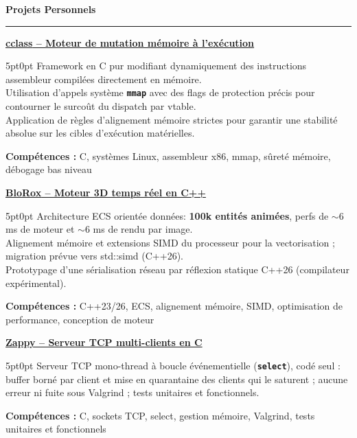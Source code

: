 \documentclass[9pt]{extarticle}
\begin{document}
\par\vspace{5pt}

{\large\bfseries Projets Personnels}
\par\vspace{-8pt}
\rule{\linewidth}{0.4pt}
\par\vspace{5pt}

\underline{\bfseries \href{https://github.com/paulogarithm/cclass}{cclass} -- Moteur de mutation mémoire à l'exécution}
\par
\begin{adjustwidth}{5pt}{0pt}
    Framework en C pur modifiant dynamiquement des instructions assembleur compilées directement en mémoire. \\
    Utilisation d'appels système {\bfseries \texttt{mmap}} avec des flags de protection précis pour contourner le surcoût du dispatch par vtable. \\
    Application de règles d'alignement mémoire strictes pour garantir une stabilité absolue sur les cibles d'exécution matérielles.
\end{adjustwidth}
\par
{\bfseries Compétences :} C, systèmes Linux, assembleur x86, mmap, sûreté mémoire, débogage bas niveau

\par\vspace{8pt}

\underline{\bfseries \href{https://github.com/paulogarithm/blorox}{BloRox} -- Moteur 3D temps réel en C++}
\par
\begin{adjustwidth}{5pt}{0pt}
	Architecture ECS orientée données: {\bfseries 100k entités animées}, perfs de $\sim$6 ms de moteur et $\sim$6 ms de rendu par image. \\
	Alignement mémoire et extensions SIMD du processeur pour la vectorisation ; migration prévue vers {\ttfamily std::simd} (C++26). \\
	Prototypage d'une sérialisation réseau par réflexion statique C++26 (compilateur expérimental).
\end{adjustwidth}
\par
{\bfseries Compétences :} C++23/26, ECS, alignement mémoire, SIMD, optimisation de performance, conception de moteur

\par\vspace{8pt}

\underline{\bfseries Zappy -- Serveur TCP multi-clients en C}
\par
\begin{adjustwidth}{5pt}{0pt}
    Serveur TCP mono-thread à boucle événementielle ({\bfseries \texttt{select}}), codé seul : buffer borné par client et mise en quarantaine des clients qui le saturent ; aucune erreur ni fuite sous Valgrind ; tests unitaires et fonctionnels.
\end{adjustwidth}
\par
{\bfseries Compétences :} C, sockets TCP, select, gestion mémoire, Valgrind, tests unitaires et fonctionnels
\end{document}
